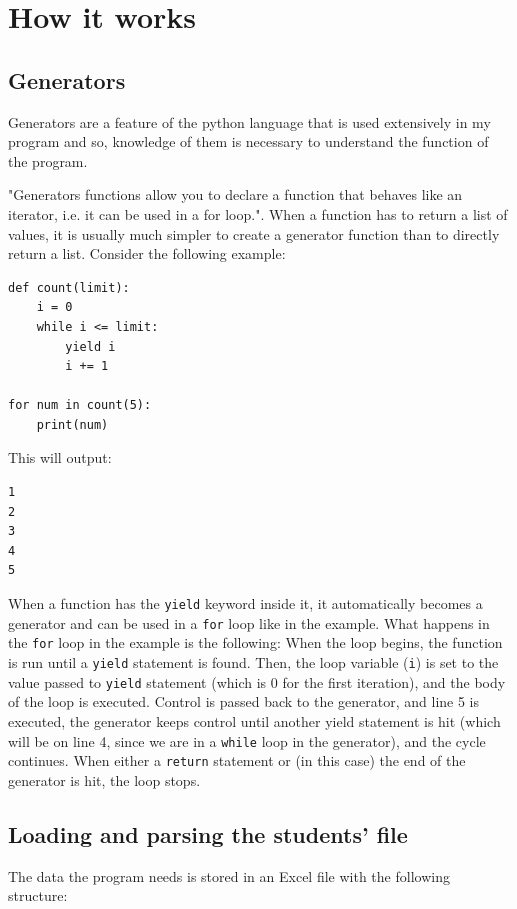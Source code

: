 \documentclass[12pt]{article}
\begin{document}
\section{How it works}

\subsection{Generators}

Generators are a feature of the python language that is used extensively in my program and
so, knowledge of them is necessary to understand the function of the program. 

"Generators functions allow you to declare a function that behaves like an iterator, i.e. it
can be used in a for loop."\autocite{generators}. When a function has to return a list of
values, it is usually much simpler to create a generator function than to directly return a
list. Consider the following example:
%
\begin{verbatim}
def count(limit):
    i = 0
    while i <= limit:
        yield i
        i += 1

for num in count(5):
    print(num)
\end{verbatim}
%
This will output:\vspace{-5mm}
%
\begin{verbatim}
1
2
3
4
5
\end{verbatim}
%
When a function has the \texttt{yield} keyword inside it, it automatically becomes a
generator and can be used in a \texttt{for} loop like in the example. What happens in the
\texttt{for} loop in the example is the following: When the loop begins, the function is run
until a \texttt{yield} statement is found. Then, the loop variable (\texttt{i}) is set to
the value passed to \texttt{yield} statement (which is 0 for the first iteration), and the
body of the loop is executed. Control is passed back to the generator, and line 5 is
executed, the generator keeps control until another yield statement is hit (which will be on
line 4, since we are in a \texttt{while} loop in the generator), and the cycle continues.
When either a \texttt{return} statement or (in this case) the end of the generator is hit,
the loop stops.

\subsection{Loading and parsing the students' file}

The data the program needs is stored in an Excel file with the following structure:
\end{document}
